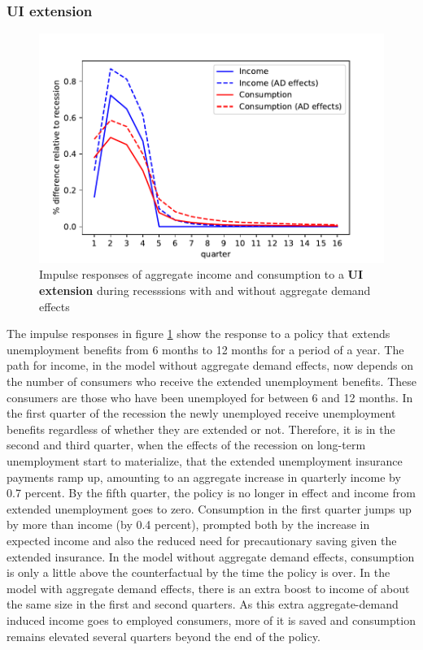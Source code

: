 \documentclass[../HAFiscal]{subfiles}
\begin{document}
\subsubsection{UI extension}

\begin{figure}
	\centering
	\includegraphics[width=0.8\linewidth]{Code/HA-Models/FromPandemicCode/Figures/recession_UI_relrecession}
	\caption{Impulse responses of aggregate income and consumption to a \textbf{UI extension} during recesssions with and without aggregate demand effects}
	\label{fig:recessionuirelrecession}
\end{figure}

The impulse responses in figure \ref{fig:recessionuirelrecession} show the response to a policy that extends unemployment benefits from 6 months to 12 months for a period of a year. The path for income, in the model without aggregate demand effects, now depends on the number of consumers who receive the extended unemployment benefits. These consumers are those who have been unemployed for between 6 and 12 months. In the first quarter of the recession the newly unemployed receive unemployment benefits regardless of whether they are extended or not. Therefore, it is in the second and third quarter, when the effects of the recession on long-term unemployment start to materialize, that the extended unemployment insurance payments ramp up, amounting to an aggregate increase in quarterly income by 0.7 percent. By the fifth quarter, the policy is no longer in effect and income from extended unemployment goes to zero. Consumption in the first quarter jumps up by more than income (by 0.4 percent), prompted both by the increase in expected income and also the reduced need for precautionary saving given the extended insurance. In the model without aggregate demand effects, consumption is only a little above the counterfactual by the time the policy is over. In the model with aggregate demand effects, there is an extra boost to income of about the same size in the first and second quarters. As this extra aggregate-demand induced income goes to employed consumers, more of it is saved and consumption remains elevated several quarters beyond the end of the policy.
\end{document}
